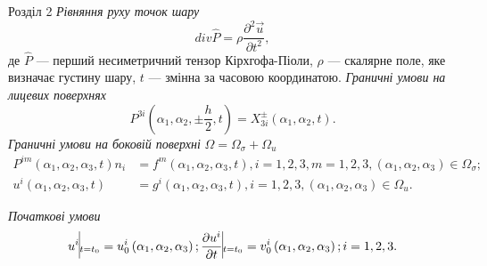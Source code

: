 \documentclass[8pt]{beamer}
\numberwithin{figure}{section}
\numberwithin{equation}{section}
\begin{document}
\begin{frame}{Розділ 2}
\emph{Рівняння руху точок шару}
\begin{equation} \label{eq:P}
div \hat{P} = \rho \frac{\partial^2 \vec{u}}{\partial t^2},
\end{equation}
де $\hat{P}$ --- перший несиметричний тензор Кірхгофа-Піоли, $\rho$ --- скалярне поле, яке визначає густину шару, $t$ --- змінна за часовою координатою.
\linebreak 
\linebreak 
\emph{Граничні умови на лицевих поверхнях}
\begin{equation}
P^{3i}\left( \alpha_1, \alpha_2, \pm \frac{h}{2}, t \right) = X^{\pm}_{3i}\left( \alpha_1, \alpha_2, t \right).
\end{equation}
\linebreak
\emph{Граничні умови на боковій поверхні} $\Omega = \Omega_{\sigma} + \Omega_{u} $
\begin{align}
P^{im}\left( \alpha_1, \alpha_2, \alpha_3, t \right)n_i &= f^{m}\left( \alpha_1, \alpha_2, \alpha_3, t \right), i=1,2,3, m=1,2,3, \left( \alpha_1, \alpha_2,\alpha_3\right)\in\Omega_{\sigma};\\
u^{i}\left( \alpha_1, \alpha_2, \alpha_3, t \right) &=g^{i}\left( \alpha_1, \alpha_2, \alpha_3, t \right), i=1,2,3, \left( \alpha_1, \alpha_2,\alpha_3\right)\in\Omega_{u}.
\end{align}

\emph{Початкові умови}
\begin{equation}
u^{i}\vline _{t=t_0} = u^i_0 \left( \alpha_1, \alpha_2, \alpha_3 \right); \frac{\partial u^{i}}{\partial t}\vline _{t=t_0} =v^i_0 \left( \alpha_1, \alpha_2, \alpha_3 \right); i=1,2,3.
\end{equation}

\end{frame}
\end{document}

